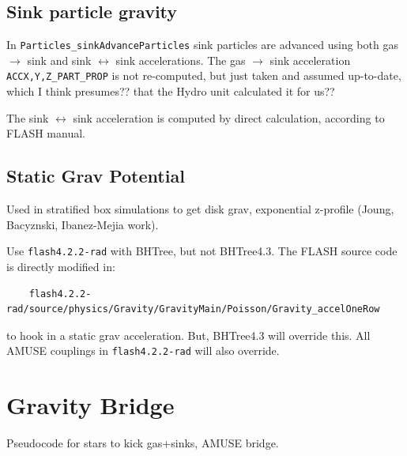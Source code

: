 \documentclass[10pt]{article}
\begin{document}
\subsection{Sink particle gravity}

In \texttt{Particles\_sinkAdvanceParticles} sink particles are advanced using
both gas $\to$ sink and sink $\leftrightarrow$ sink accelerations.
The gas $\to$ sink acceleration \texttt{ACC{X,Y,Z}\_PART\_PROP} is not re-computed,
but just taken and assumed up-to-date, which I think presumes?? that the Hydro
unit calculated it for us??

The sink $\leftrightarrow$ sink acceleration is computed by direct calculation,
according to FLASH manual.

\subsection{Static Grav Potential}

Used in stratified box simulations to get disk grav, exponential z-profile
(Joung, Bacyznski, Ibanez-Mejia work).

Use \texttt{flash4.2.2-rad} with BHTree, but not BHTree4.3.
The FLASH source code is directly modified in:
\begin{verbatim}
    flash4.2.2-rad/source/physics/Gravity/GravityMain/Poisson/Gravity_accelOneRow
\end{verbatim}
to hook in a static grav acceleration.
But, BHTree4.3 will override this.
All AMUSE couplings in \texttt{flash4.2.2-rad} will also override.


\section{Gravity Bridge}

Pseudocode for stars to kick gas+sinks, AMUSE bridge.
\end{document}
